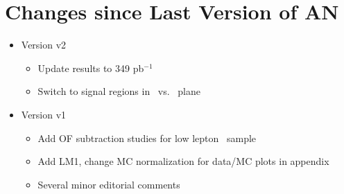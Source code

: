 \section{Changes since Last Version of AN}
\label{sec:changes}

\begin{itemize}
\item Version v2
  \begin{itemize}
  \item Update results to 349 pb$^{-1}$
  \item Switch to signal regions in \met\ vs. \Ht\ plane
  \end{itemize}
\item Version v1
  \begin{itemize}
  \item Add OF subtraction studies for low lepton \pt\ sample
  \item Add LM1, change MC normalization for data/MC plots in appendix
  \item Several minor editorial comments
  \end{itemize}
\end{itemize}
